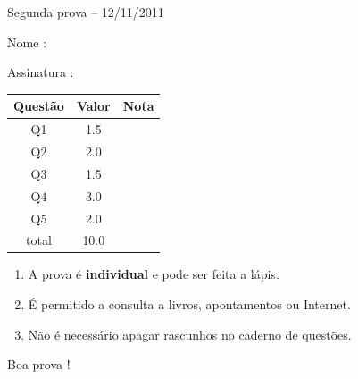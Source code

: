 \documentclass[11pt]{article}
\begin{document}
\begin{center}
{}

{

Segunda prova -- 12/11/2011
}
\end{center}


\bigskip

\begin{spacing}{2}
\noindent Nome  : \hrulefill

\noindent Assinatura : \hrulefill
\end{spacing}

\vspace{1.0cm}
\centering
\begin{spacing}{1.5}
\begin{tabular}{|c|c|c|} \hline
Questão & Valor & Nota \\ \hline
Q1 & 1.5 & \\ \hline
Q2 & 2.0 & \\ \hline
Q3 & 1.5 & \\ \hline
Q4 & 3.0 & \\ \hline
Q5 & 2.0 & \\ \hline
total & 10.0 & \\ \hline
\end{tabular}
\end{spacing}
\vspace{1.0cm}

\begin{boxedminipage}{\textwidth}
\begin{enumerate}
\item A prova é \textbf{individual} e pode ser feita a lápis.
\item É permitido a consulta a livros, apontamentos ou Internet.
\item Não é necessário apagar rascunhos no caderno de questões.
\end{enumerate}
\end{boxedminipage}

\bigskip

\vspace{2cm}
\begin{flushright}
Boa prova !
\end{flushright}
\end{document}

